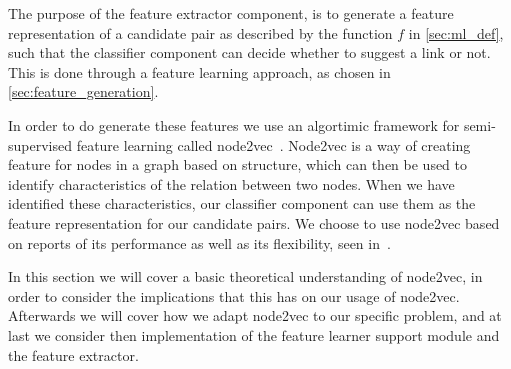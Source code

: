 The purpose of the feature extractor component, is to generate a feature representation of a candidate pair as described by the function $f$ in \cref{sec:ml_def}, such that the classifier component can decide whether to suggest a link or not. This is done through a feature learning approach, as chosen in \cref{sec:feature_generation}.

In order to do generate these features we use an algortimic framework for semi-supervised feature learning called node2vec~\cite{node2vec}. Node2vec is a way of creating feature for nodes in a graph based on structure, which can then be used to identify characteristics of the relation between two nodes. When we have identified these characteristics, our classifier component can use them as the feature representation for our candidate pairs. We choose to use node2vec based on reports of its performance as well as its flexibility, seen in~\cite{node2vec}.

In this section we will cover a basic theoretical understanding of node2vec, in order to consider the implications that this has on our usage of node2vec. Afterwards we will cover how we adapt node2vec to our specific problem, and at last we consider then implementation of the feature learner support module and the feature extractor.





